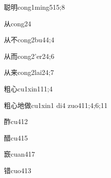 \begin{verbete}{聪明}{cong1ming5}{15;8}
\end{verbete}

\begin{verbete}{从}{cong2}{4}
\end{verbete}

\begin{verbete}{从不}{cong2bu4}{4;4}
\end{verbete}

\begin{verbete}{从而}{cong2'er2}{4;6}
\end{verbete}

\begin{verbete}{从来}{cong2lai2}{4;7}
\end{verbete}

\begin{verbete}{粗心}{cu1xin1}{11;4}
\end{verbete}

\begin{verbete}{粗心地做}{cu1xin1 di4 zuo4}{11;4;6;11}
\end{verbete}

\begin{verbete}{酢}{cu4}{12}
\end{verbete}

\begin{verbete}{醋}{cu4}{15}
\end{verbete}

\begin{verbete}{窾}{cuan4}{17}
\end{verbete}

\begin{verbete}{错}{cuo4}{13}
\end{verbete}

